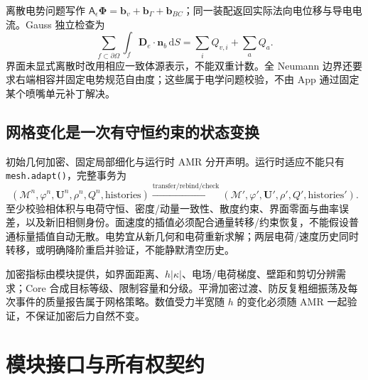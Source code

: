 \documentclass[UTF8,a4paper,11pt,fontset=fandol]{ctexart}
\numberwithin{equation}{section}
\newcommand{\code}[1]{\nolinkurl{#1}}
\newcommand{\dd}{\,\mathrm{d}}
\newcommand{\nn}{\bm n}
\newcommand{\mat}[1]{\mathsf{#1}}
\begin{document}
离散电势问题写作 $\mat A_\epsilon\bm\Phi=\bm b_v+\bm b_\Gamma+\bm b_{BC}$；同一装配返回实际法向电位移与导电电流。Gauss 独立检查为
\begin{equation}
 \sum_{f\subset\partial\Omega}\int_f\bm D_e\cdot\nn_b\dd S
 =\sum_i Q_{v,i}+\sum_a Q_a .
\end{equation}
界面未显式离散时改用相应一致体源表示，不能双重计数。全 Neumann 边界还要求右端相容并固定电势规范自由度；这些属于电学问题校验，不由 App 通过固定某个喷嘴单元补丁解决。

\subsection{网格变化是一次有守恒约束的状态变换}
初始几何加密、固定局部细化与运行时 AMR 分开声明。运行时适应不能只有 \code{mesh.adapt()}，完整事务为
\begin{equation}
 (\mathcal M^n,\varphi^n,\bm U^n,\rho^n,Q^n,\text{histories})
 \xrightarrow{\text{transfer/rebind/check}}
 (\mathcal M',\varphi',\bm U',\rho',Q',\text{histories}').
\end{equation}
至少校验相体积与电荷守恒、密度/动量一致性、散度约束、界面零面与曲率误差，以及新旧相侧身份。面速度的插值必须配合通量转移/约束恢复，不能假设普通标量插值自动无散。电势宜从新几何和电荷重新求解；两层电荷/速度历史同时转移，或明确降阶重启并验证，不能静默清空历史。

加密指标由模块提供，如界面距离、$h|\kappa|$、电场/电荷梯度、壁距和剪切分辨需求；Core 合成目标等级、限制容量和分级。平滑加密过渡、防反复粗细振荡及每次事件的质量报告属于网格策略。数值受力半宽随 $h$ 的变化必须随 AMR 一起验证，不保证加密后力自然不变。

\section{模块接口与所有权契约}\label{sec:api}
\end{document}
